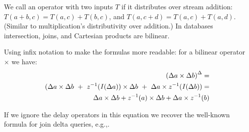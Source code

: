 We call an operator with two inputs $T$  if it
distributes over stream addition: $T(a+b, c) = T(a, c) + T(b, c)$, and
$T(a, c+d) = T(a, c) + T(a, d)$.  (Similar to multiplication's
distributivity over addition.)  In databases intersection, joins, and
Cartesian products are bilinear.

Using infix notation to make the formulas more readable: for a
bilinear operator $\times$ we have:
\begin{eqnarray*}
{(\Delta a \times \Delta b)}^{\Delta} = \\
(\Delta a \times \Delta b ~+~ z^{-1}(\mathit{I}(\Delta a)) \times
\Delta b ~+~ \Delta a \times z^{-1}(\mathit{I}(\Delta b)) = \\
\Delta a \times \Delta b + z^{-1}(a) \times \Delta b + \Delta a \times z^{-1}(b)
\end{eqnarray*}

If we ignore the delay operators in this equation we recover the
well-known formula for join delta queries, e.g.,\cite{koch-pods10}.

